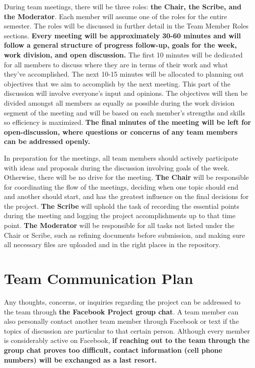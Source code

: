 \documentclass[12pt, titlepage]{article}
\begin{document}
During team meetings, there will be three roles: \textbf{the Chair, the Scribe, and the Moderator}. Each member will assume one of the roles for the entire semester. The roles will be discussed in further detail in the Team Member Roles sections. \textbf{Every meeting will be approximately 30-60 minutes and will follow a general structure of progress follow-up, goals for the week, work division, and open discussion.} The first 10 minutes will be dedicated for all members to discuss where they are in terms of their work and what they've accomplished. The next 10-15 minutes will be allocated to planning out objectives that we aim to accomplish by the next meeting. This part of the discussion will involve everyone's input and opinions. The objectives will then be divided amongst all members as equally as possible during the work division segment of the meeting and will be based on each member's strengths and skills so efficiency is maximized. \textbf{The final minutes of the meeting will be left for open-discussion, where questions or concerns of any team members can be addressed openly.}

In preparation for the meetings, all team members should actively participate with ideas and proposals during the discussion involving goals of the week. Otherwise, there will be no drive for the meeting. \textbf{The Chair} will be responsible for coordinating the flow of the meetings, deciding when one topic should end and another should start, and has the greatest influence on the final decisions for the project. \textbf{The Scribe} will uphold the task of recording the essential points during the meeting and logging the project accomplishments up to that time point. \textbf{The Moderator} will be responsible for all tasks not listed under the Chair or Scribe, such as refining documents before submission, and making sure all necessary files are uploaded and in the right places in the repository.
  

\section {Team Communication Plan}
Any thoughts, concerns, or inquiries regarding the project can be addressed to the team through \textbf{the Facebook Project group chat}. A team member can also personally contact another team member through Facebook or text if the topics of discussion are particular to that certain person. Although every member is considerably active on Facebook, \textbf{if reaching out to the team through the group chat proves too difficult, contact information (cell phone numbers) will be exchanged as a last resort.}
\end{document}

